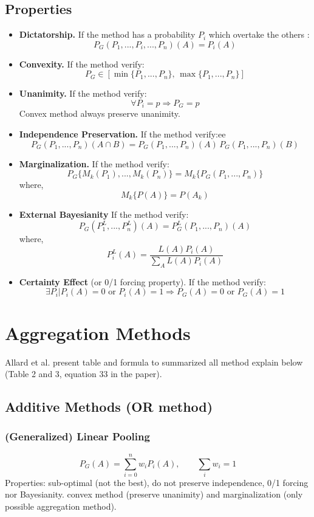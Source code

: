 \documentclass[twocolumn]{article}
\numberwithin{equation}{section}
\begin{document}
\subsection{Properties}
\begin{itemize}
	\item \textbf{Dictatorship.} If the method has a probability $P_i$ which overtake the others :
$$P_G(P_1,...,P_i,...,P_n)(A)=P_i(A)$$
	\item \textbf{Convexity.} If the method verify:
$$P_G \in \left[\min\{P_1,...,P_n\},\, \max\{P_1,...,P_n\}\right] $$
	\item \textbf{Unanimity.} If the method verify:
$$ \forall P_i=p \Rightarrow P_G = p $$
Convex method always preserve unanimity.
	\item \textbf{Independence Preservation.} If the method verify:ee
$$P_G(P_1,...,P_n)(A\cap B)=P_G(P_1,...,P_n)(A) \, P_G(P_1,...,P_n)(B)$$
	\item \textbf{Marginalization.} If the method verify:
$$P_G\{M_k(P_1),... ,M_k(P_n)\}=M_k\{P_G(P_1,...,P_n)\}$$ 
where,
$$M_k\{P(A)\}=P(A_k)$$

	\item \textbf{External Bayesianity} If the method verify:
$$ P_G(P^L_1 ,...,P^L_n)(A)=P^L_G(P_1,...,P_n)(A) $$
where,
$$P^L_i(A)=\frac{L(A)P_i(A)}{\sum_A L(A) P_i(A)}$$
	\item \textbf{Certainty Effect} (or 0/1 forcing property).  If the method verify:
$$\exists P_i | P_i(A)=0 \text{ or } P_i(A)=1 \Rightarrow P_G(A)=0 \text{ or } P_G(A)=1 $$
\end{itemize}





\newpage
\section{Aggregation Methods}
Allard et al. present table and formula to summarized all method explain below (Table 2 and 3, equation 33 in the paper).
	\subsection{Additive Methods (OR method)} 	
		\subsubsection{(Generalized) Linear Pooling} 
$$P_G(A) = \sum_{i=0}^nw_i P_i(A), \qquad \sum_i w_i=1$$
Properties: sub-optimal (not the best), do not preserve independence, 0/1 forcing nor Bayesianity. convex method (preserve unanimity) and marginalization (only possible aggregation method).
\end{document}
